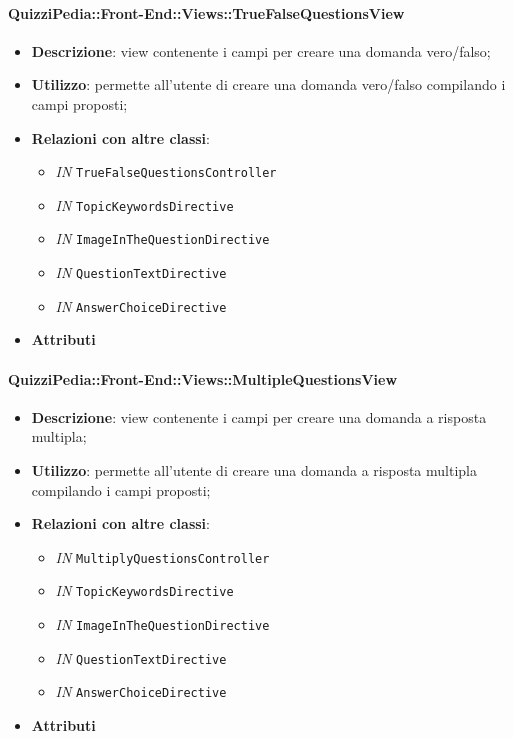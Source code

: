 \paragraph{QuizziPedia::Front-End::Views::TrueFalseQuestionsView}
\begin{itemize}
	\item \textbf{Descrizione}: view contenente i campi per creare una domanda vero/falso; 
	\item \textbf{Utilizzo}: permette all'utente di creare una domanda vero/falso compilando i campi proposti;
	\item \textbf{Relazioni con altre classi}:
	\begin{itemize}
		\item \textit{IN} \texttt{TrueFalseQuestionsController} \\
		\item \textit{IN} \texttt{TopicKeywordsDirective} \\
		\item \textit{IN} \texttt{ImageInTheQuestionDirective} \\
		\item \textit{IN} \texttt{QuestionTextDirective} \\
		\item \textit{IN} \texttt{AnswerChoiceDirective} \\   
	\end{itemize}
\item \textbf{Attributi}
\end{itemize}

\paragraph{QuizziPedia::Front-End::Views::MultipleQuestionsView}
\begin{itemize}
	\item \textbf{Descrizione}: view contenente i campi per creare una domanda a risposta multipla;
	\item \textbf{Utilizzo}: permette all'utente di creare una domanda a risposta multipla compilando i campi proposti;
	\item \textbf{Relazioni con altre classi}:
		\begin{itemize}
			\item \textit{IN} \texttt{MultiplyQuestionsController} \\
			\item \textit{IN} \texttt{TopicKeywordsDirective} \\
			\item \textit{IN} \texttt{ImageInTheQuestionDirective} \\
			\item \textit{IN} \texttt{QuestionTextDirective} \\
			\item \textit{IN} \texttt{AnswerChoiceDirective} \\   
		\end{itemize}
	\item \textbf{Attributi}
\end{itemize}

